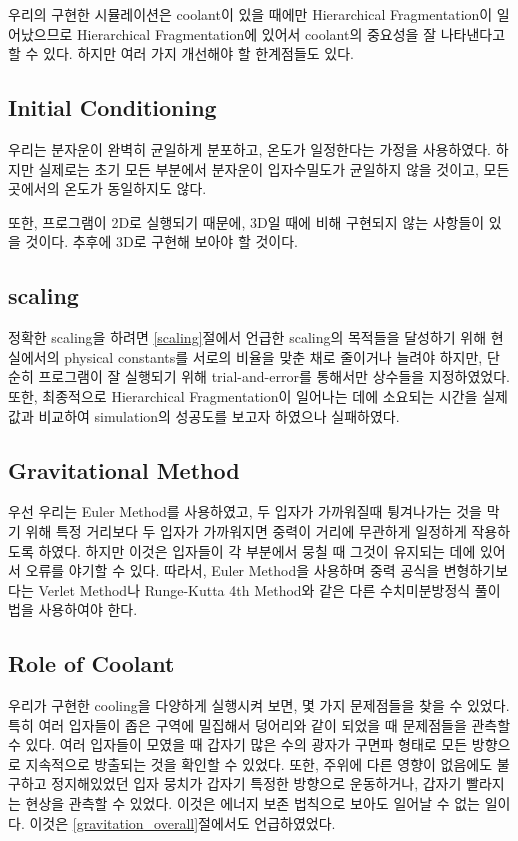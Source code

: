 \documentclass{gshs-hutech}
\begin{document}
우리의 구현한 시뮬레이션은 coolant이 있을 때에만 Hierarchical Fragmentation이 일어났으므로 Hierarchical Fragmentation에 있어서 coolant의 중요성을 잘 나타낸다고 할 수 있다. 하지만 여러 가지 개선해야 할 한계점들도 있다.

\subsection{Initial Conditioning}
우리는 분자운이 완벽히 균일하게 분포하고, 온도가 일정한다는 가정을 사용하였다. 하지만 실제로는 초기 모든 부분에서 분자운이 입자수밀도가 균일하지 않을 것이고, 모든 곳에서의 온도가 동일하지도 않다. 

또한, 프로그램이 2D로 실행되기 때문에, 3D일 때에 비해 구현되지 않는 사항들이 있을 것이다. 추후에 3D로 구현해 보아야 할 것이다.

\subsection{scaling}
정확한 scaling을 하려면 \ref{scaling}절에서 언급한 scaling의 목적들을 달성하기 위해 현실에서의 physical constants를 서로의 비율을 맞춘 채로 줄이거나 늘려야 하지만, 단순히 프로그램이 잘 실행되기 위해 trial-and-error를 통해서만 상수들을 지정하였었다. 또한, 최종적으로 Hierarchical Fragmentation이 일어나는 데에 소요되는 시간을 실제 값과 비교하여 simulation의 성공도를 보고자 하였으나 실패하였다.

\subsection{Gravitational Method}
우선 우리는 Euler Method를 사용하였고, 두 입자가 가까워질때 튕겨나가는 것을 막기 위해 특정 거리보다 두 입자가 가까워지면 중력이 거리에 무관하게 일정하게 작용하도록 하였다. 하지만 이것은 입자들이 각 부분에서 뭉칠 때 그것이 유지되는 데에 있어서 오류를 야기할 수 있다. 따라서, Euler Method을 사용하며 중력 공식을 변형하기보다는 Verlet Method나 Runge-Kutta 4th Method와 같은 다른 수치미분방정식 풀이법을 사용하여야 한다.

\subsection{Role of Coolant}
우리가 구현한 cooling을 다양하게 실행시켜 보면, 몇 가지 문제점들을 찾을 수 있었다. 
특히 여러 입자들이 좁은 구역에 밀집해서 덩어리와 같이 되었을 때 문제점들을 관측할 수 있다. 여러 입자들이 모였을 때 갑자기 많은 수의 광자가 구면파 형태로 모든 방향으로 지속적으로 방출되는 것을 확인할 수 있었다. 또한, 주위에 다른 영향이 없음에도 불구하고 정지해있었던 입자 뭉치가 갑자기 특정한 방향으로 운동하거나, 갑자기 빨라지는 현상을 관측할 수 있었다. 이것은 에너지 보존 법칙으로 보아도 일어날 수 없는 일이다. 이것은 \ref{gravitation_overall}절에서도 언급하였었다.
\end{document}
